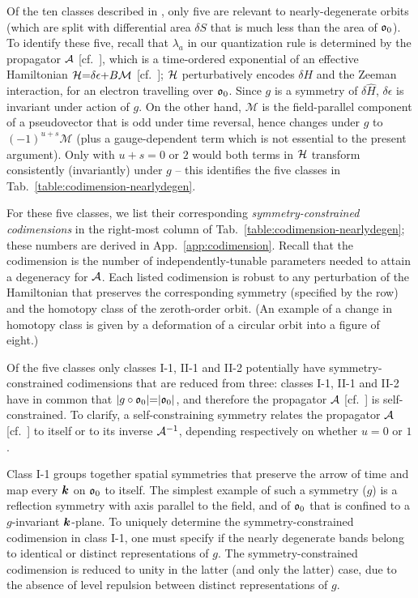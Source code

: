 \documentclass[aps, showpacs, twocolumn, notitlepage, superscriptaddress]{revtex4-1}
\begin{document}
Of the ten classes described in , only five are relevant to nearly-degenerate orbits (which are split with differential area  $\delta S$ that is much less than the area of $\mathfrak{o}_0$).
To identify these five, recall that $\lambda_a$ in our quantization rule is determined by the propagator ${\cal A}$ [cf.\ ], which is a time-ordered exponential of an effective Hamiltonian $\mathcal{H}{=}\delta\epsilon{+}B \mathcal{M}$ [cf.\ ]; $\mathcal{H}$ perturbatively encodes $\delta H$ and the Zeeman interaction, for an electron travelling over  $\mathfrak{o}_0$. Since $g$ is  a symmetry of  $\delta \hat{H}$, $\delta\epsilon$ is invariant under action of $g$. On the other hand, $\mathcal{M}$ is the field-parallel component of a pseudovector that is odd under time reversal\cite{sakurai1995modern}, hence changes under $g$ to  $(-1)^{u+s}\mathcal{M}$ (plus a gauge-dependent term\cite{100p} which is not essential to the present argument). Only with $u{+}s{=}0$ or $2$ would both terms in $\mathcal{H}$ transform consistently (invariantly) under $g$ -- this identifies the five classes in Tab.\ \ref{table:codimension-nearlydegen}.

For these five classes, we list their corresponding \textit{symmetry-constrained codimensions} in the right-most column of Tab.\ \ref{table:codimension-nearlydegen}; these numbers are derived in  App.\ \ref{app:codimension}. Recall that the codimension is the number of independently-tunable parameters needed to attain a degeneracy for ${\cal A}$. Each listed codimension is robust to any perturbation of the Hamiltonian that preserves the corresponding symmetry (specified by the row) and the homotopy class\cite{100p} of the zeroth-order orbit. (An example of a change in homotopy class is given by a deformation of a circular orbit into a figure of eight.) 

Of the five classes only classes I-1, II-1 and II-2 potentially have symmetry-constrained codimensions that are reduced from three: classes I-1, II-1 and II-2 have in common that  $|g\circ\mathfrak{o}_0|{=}|\mathfrak{o}_0|$, and therefore the propagator ${\cal A}$ [cf.\ ] is self-constrained. To clarify, a self-constraining symmetry relates the propagator ${\cal A}$ [cf.\ ] to itself or to its inverse ${\cal A}^{-1}$, depending respectively on whether $u{=}0$ or $1$.

Class I-1 groups together spatial symmetries that preserve the arrow of time and map every $\boldsymbol{k}$ on $\mathfrak{o}_0$ to itself. The simplest example of such a symmetry ($g$) is a reflection symmetry with axis parallel to the field, and of  $\mathfrak{o}_0$ that is confined to a $g$-invariant $\boldsymbol{k}$-plane. To uniquely determine the symmetry-constrained codimension in class I-1, one must specify if the nearly degenerate bands belong to identical or distinct representations of $g$. The symmetry-constrained codimension is reduced to unity in the latter (and only the latter) case, due to the absence of level repulsion between distinct representations of $g$. 
\end{document}
